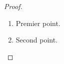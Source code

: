 \begin{proof}
  \begin{enumerate}
    \item Premier point. \qedhere
    \item Second point.
  \end{enumerate}
\end{proof} %
